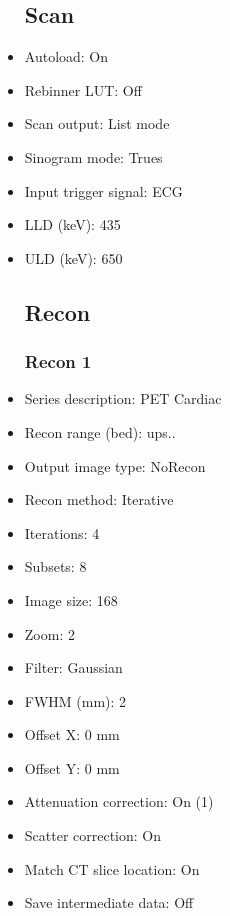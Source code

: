 \documentclass[12pt]{article}
\begin{document}
\begin{itemize}
\subsection{Scan}
\item Autoload: On
\item Rebinner LUT: Off
\item Scan output: List mode
\item Sinogram mode: Trues
\item Input trigger signal: ECG
\item LLD (keV): 435
\item ULD (keV): 650
\subsection{Recon}

\subsubsection{Recon 1}
\item Series description: PET Cardiac
\item Recon range (bed): ups..
\item Output image type: NoRecon
\item Recon method: Iterative
\item Iterations: 4
\item Subsets: 8
\item Image size: 168
\item Zoom: 2
\item Filter: Gaussian
\item FWHM (mm): 2
\item Offset X: 0 mm
\item Offset Y: 0 mm
\item Attenuation correction: On (1)
\item Scatter correction: On
\item Match CT slice location: On
\item Save intermediate data: Off
\end{itemize}
\end{document}
